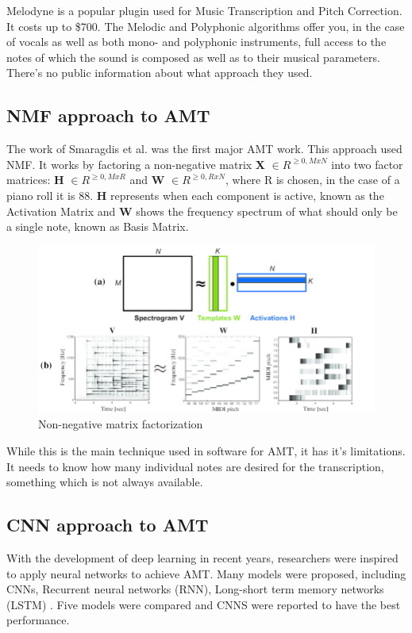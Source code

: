 Melodyne is a popular plugin used for Music Transcription and Pitch Correction. It costs up to \$700. 	
The Melodic and Polyphonic algorithms offer you, in the case of vocals as well as both mono- and polyphonic instruments, full access to the notes of which the sound is composed as well as to their musical parameters.
There's no public information about what approach they used.
\par

\subsection{NMF approach to AMT}
The work of Smaragdis et al.\cite{REF:8} was the first major AMT work. This approach used NMF. It works by factoring a non-negative matrix \textbf{X} $\in R^{\geq 0, MxN}$ into two factor matrices: \textbf{H} $\in R^{\geq 0, MxR}$ and \textbf{W} $\in R^{\geq 0, RxN}$, where R is chosen, in the case of a piano roll it is 88. \textbf{H} represents when each component is active, known as the Activation Matrix and \textbf{W} shows the frequency spectrum of what should only be a single note, known as Basis Matrix. \cite{NMF}
\par

\begin{figure}[h]
	\caption[Non-negative matrix factorization]{Non-negative matrix factorization \cite{NMF_figure}}
	\centering
	\includegraphics[width=1\textwidth, height=\textheight, keepaspectratio]{"resources/NMF"}
\end{figure}

While this is the main technique used in software for AMT, it has it's limitations. It needs to know how many individual notes are desired for the transcription, something which is not always available.

\subsection{CNN approach to AMT}
With the development of deep learning in recent years, researchers were inspired to apply neural networks to achieve AMT. Many models were proposed, including CNNs, Recurrent neural networks (RNN), Long-short term memory networks (LSTM) \cite{REF:1} \cite{REF:5}. Five models were compared and CNNS were reported to have the best performance. \cite{REF:7} 
\par

